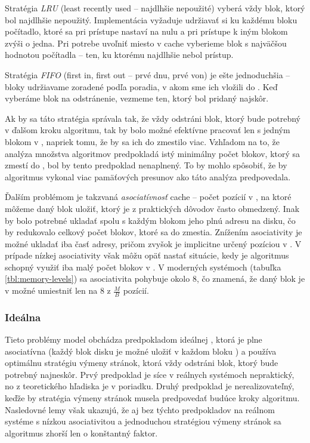 Stratégia \emph{LRU} (least recently used -- najdlhšie nepoužité) vyberá vždy blok, ktorý bol najdlhšie nepoužitý. Implementácia vyžaduje udržiavať si ku každému bloku počítadlo, ktoré sa pri prístupe nastaví na nulu a pri prístupe k iným blokom zvýši o jedna. Pri potrebe uvoľniť miesto v cache vyberieme blok s najväčšou hodnotou počítadla -- ten, ku ktorému najdlhšie nebol prístup.

Stratégia \emph{FIFO} (first in, first out -- prvé dnu, prvé von) je ešte jednoduchšia -- bloky udržiavame zoradené podľa poradia, v akom sme ich vložili do \cache. Keď vyberáme blok na odstránenie, vezmeme ten, ktorý bol pridaný najskôr.

Ak by sa táto stratégia správala tak, že vždy odstráni blok, ktorý bude potrebný v ďalšom kroku algoritmu, tak by bolo možné efektívne pracovať len s jedným blokom v \cache, napriek tomu, že by sa ich do \cache zmestilo viac. Vzhľadom na to, že analýza množstva \obliv algoritmov predpokladá istý minimálny počet blokov, ktorý sa zmestí do \cache, bol by tento predpoklad nenaplnený. To by mohlo spôsobiť, že by algoritmus vykonal viac pamäťových presunov ako táto analýza predpovedala.

Ďalším problémom je takzvaná \emph{asociatívnosť} cache -- počet pozícií v \cache, na ktoré môžeme daný blok uložiť, ktorý je z praktických dôvodov často obmedzený. Inak by bolo potrebné ukladať spolu s každým blokom jeho plnú adresu na disku, čo by redukovalo celkový počet blokov, ktoré sa do \cache zmestia. Znížením asociativity je možné ukladať iba časť adresy, pričom zvyšok je implicitne určený pozíciou v \cache. V prípade nízkej asociativity však môžu opäť nastať situácie, kedy je algoritmus schopný využiť iba malý počet blokov v \cache. V moderných systémoch (tabuľka \ref{tbl:memory-levels}) sa asociativita pohybuje okolo $8$, čo znamená, že daný blok je v \cache možné umiestniť len na $8$ z $\frac{M}{B}$ pozícií.

\subsubsection{Ideálna \cache}

Tieto problémy \obliv model obchádza predpokladom ideálnej \cache, ktorá je plne asociatívna (každý blok disku je možné uložiť v každom bloku \cache) a používa optimálnu stratégiu výmeny stránok, ktorá vždy odstráni blok, ktorý bude potrebný najneskôr. Prvý predpoklad je síce v reálnych systémoch nepraktický, no z teoretického hľadiska je v poriadku. Druhý predpoklad je nerealizovateľný, keďže by stratégia výmeny stránok musela predpovedať budúce kroky algoritmu. Nasledovné lemy však ukazujú, že aj bez týchto predpokladov na reálnom systéme s nízkou asociativitou a jednoduchou stratégiou výmeny stránok sa algoritmus zhorší len o konštantný faktor.

